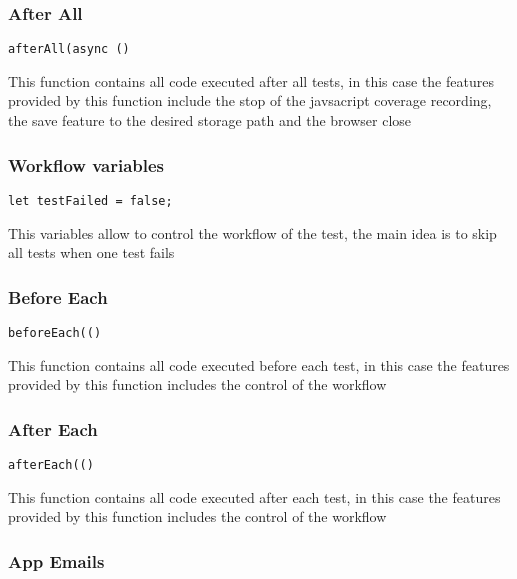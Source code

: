 \documentclass[a4paper]{article}
\begin{document}
\subsubsection{After All}

\begin{lstlisting}
afterAll(async ()
\end{lstlisting}

This function contains all code executed after all tests, in this case the
features provided by this function include the stop of the javsacript coverage
recording, the save feature to the desired storage path and the browser close

\hypertarget{toc134}{}
\subsubsection{Workflow variables}

\begin{lstlisting}
let testFailed = false;
\end{lstlisting}

This variables allow to control the workflow of the test, the main idea is to
skip all tests when one test fails

\hypertarget{toc135}{}
\subsubsection{Before Each}

\begin{lstlisting}
beforeEach(()
\end{lstlisting}

This function contains all code executed before each test, in this case the
features provided by this function includes the control of the workflow

\hypertarget{toc136}{}
\subsubsection{After Each}

\begin{lstlisting}
afterEach(()
\end{lstlisting}

This function contains all code executed after each test, in this case the
features provided by this function includes the control of the workflow

\hypertarget{toc137}{}
\subsubsection{App Emails}
\end{document}

